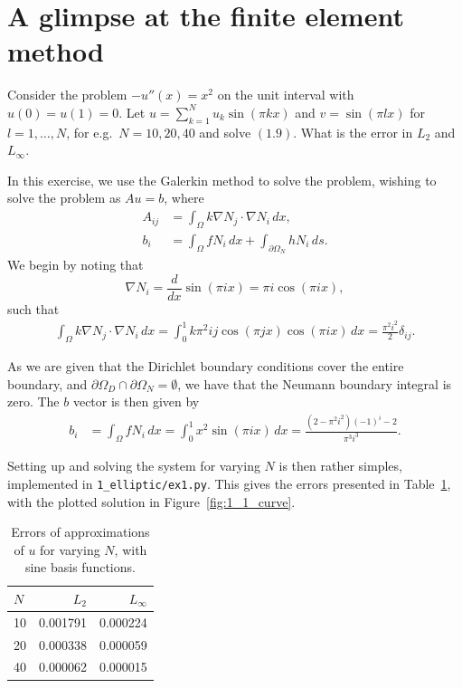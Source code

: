 \section{A glimpse at the finite element method}

\begin{exercise}
    Consider the problem $-u''(x) = x^2$ on the unit interval with $u(0) = u(1) = 0$.
    Let $u = \sum_{k = 1}^N u_k \sin{(\pi k x)}$ and $v = \sin{(\pi l x)}$ for $l = 1, \ldots, N$, for e.g.\ $N = 10, 20, 40$ and solve $(1.9)$.
    What is the error in $L_2$ and $L_\infty$.
\end{exercise}

\begin{solution}
    In this exercise, we use the Galerkin method to solve the problem, wishing to solve the problem as $Au = b$, where
    \begin{align*}
        A_{ij} &= \int_\Omega k \nabla N_j \cdot \nabla N_i \, dx, \\
        b_i &= \int_\Omega f N_i \, dx + \int_{\partial \Omega_N} h N_i \, ds.
    \end{align*}
    We begin by noting that
    \begin{equation*}
        \nabla N_i = \frac{d}{dx} \sin{(\pi i x)} = \pi i \cos{(\pi i x)},
    \end{equation*}
    such that
    \begin{align*}
        \int_\Omega k \nabla N_j \cdot \nabla N_i \, dx
        = \int_0^1 k \pi^2 i j \cos{(\pi j x)} \cos{(\pi i x)} \, dx
        = \frac{\pi^2 i^2}{2} \delta_{ij}.
    \end{align*}

    As we are given that the Dirichlet boundary conditions cover the entire boundary, and $\partial \Omega_D \cap \partial \Omega_N = \emptyset$, we have that the Neumann boundary integral is zero.
    The $b$ vector is then given by
    \begin{align*}
        b_i &= \int_\Omega f N_i \, dx
        = \int_0^1 x^2 \sin{(\pi i x)} \, dx
        = \frac{(2 - \pi^2 i^2)(-1)^i- 2}{\pi^3 i^3}.
    \end{align*}

    Setting up and solving the system for varying $N$ is then rather simples, implemented in \verb|1_elliptic/ex1.py|.
    This gives the errors presented in Table~\ref{tab:1_1}, with the plotted solution in Figure~\ref{fig:1_1_curve}.
    \begin{table}[!ht]
        \caption{Errors of approximations of $u$ for varying $N$, with sine basis functions.\label{tab:1_1}}
        \centering
        \begin{tabular}{lrr}
            \toprule
            $N$ & $L_2$ & $L_\infty$ \\
            \midrule
            10 & 0.001791 & 0.000224 \\
            20 & 0.000338 & 0.000059 \\
            40 & 0.000062 & 0.000015 \\
            \bottomrule
        \end{tabular}
    \end{table}


\end{solution}
